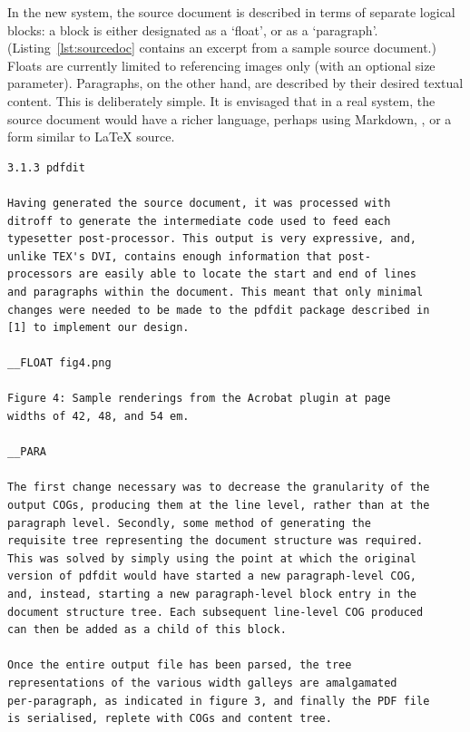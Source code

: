 In the new system, the source document is described in terms of separate logical blocks: a block is either designated as a `float', or as a `paragraph'. (Listing~\ref{lst:sourcedoc} contains an excerpt from a sample source document.) Floats are currently limited to referencing images only (with an optional size parameter). Paragraphs, on the other hand, are described by their desired textual content. This is deliberately simple. It is envisaged that in a real system, the source document would have a richer language, perhaps using Markdown, \xml{}, or a form similar to \LaTeX{} source.

\begin{lstlisting}[label=lst:sourcedoc,captionpos=b,float,basicstyle=\ttfamily\footnotesize,caption={[An excerpt from a sample source document]An excerpt from a sample source document, itself an excerpt from \cite{Pinkney2011}. The document is parsed from top to bottom. Paragraphs are separated by blank lines. Floats are specified by lines that begin \texttt{\_\_FLOAT} and contain a reference to an image. Subsequent lines, until the next \texttt{\_\_FLOAT} or \texttt{\_\_PARA} marker, are interpreted as the float caption.}]
3.1.3 pdfdit

Having generated the source document, it was processed with
ditroff to generate the intermediate code used to feed each
typesetter post-processor. This output is very expressive, and,
unlike TEX's DVI, contains enough information that post-
processors are easily able to locate the start and end of lines
and paragraphs within the document. This meant that only minimal
changes were needed to be made to the pdfdit package described in
[1] to implement our design.

__FLOAT fig4.png

Figure 4: Sample renderings from the Acrobat plugin at page
widths of 42, 48, and 54 em.

__PARA

The first change necessary was to decrease the granularity of the
output COGs, producing them at the line level, rather than at the
paragraph level. Secondly, some method of generating the
requisite tree representing the document structure was required.
This was solved by simply using the point at which the original
version of pdfdit would have started a new paragraph-level COG,
and, instead, starting a new paragraph-level block entry in the
document structure tree. Each subsequent line-level COG produced
can then be added as a child of this block.

Once the entire output file has been parsed, the tree
representations of the various width galleys are amalgamated
per-paragraph, as indicated in figure 3, and finally the PDF file
is serialised, replete with COGs and content tree.

\end{lstlisting}


